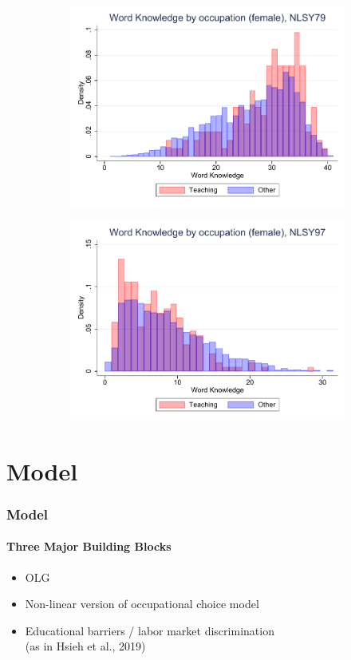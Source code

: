 \documentclass[11pt]{beamer}
\begin{document}
\begin{frame}
\begin{adjustwidth}{2em}{2em}
\begin{figure}[ht!]
\begin{subfigure}[b]{0.27\textwidth}
					\includegraphics[width=\textwidth]{nlsy79_wk_occ_no_norm_female_no_lf.pdf}
				\end{subfigure}
				\hfill
				\begin{subfigure}[b]{0.27\textwidth}
					\centering
					\includegraphics[width=\textwidth]{nlsy97_wk_occ_no_norm_female_no_lf.pdf}
				\end{subfigure}	
			\end{figure}
			\vfill
		\end{adjustwidth}
	\end{frame}
	
\section{Model}	
 \begin{frame}
		\frametitle{Model}
		\framesubtitle{Three Major Building Blocks}
		\begin{itemize}
			\item OLG
			\item Non-linear version of occupational choice model
			\item Educational barriers / labor market discrimination \\
			(as in Hsieh et al., 2019)
		\end{itemize}
	\end{frame}
	
\end{document}
